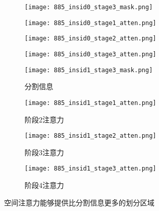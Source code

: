 \begin{figure*}
	\centering
	\begin{minipage}{\textwidth}
		\centering
		\begin{subfigure}{0.23\linewidth}
			\texttt{[image: 885\_insid0\_stage3\_mask.png]}
		\end{subfigure}
		\begin{subfigure}{0.23\linewidth}
			\texttt{[image: 885\_insid0\_stage1\_atten.png]}
		\end{subfigure}
		\begin{subfigure}{0.23\linewidth}
			\texttt{[image: 885\_insid0\_stage2\_atten.png]}
		\end{subfigure}
		\begin{subfigure}{0.23\linewidth}
			\texttt{[image: 885\_insid0\_stage3\_atten.png]}
		\end{subfigure}
		\begin{sideways}
			\begin{minipage}{1cm}
			\end{minipage}
		\end{sideways}
	\end{minipage}
	
	\vskip2pt
	\begin{minipage}{\textwidth}
		\centering
		\begin{subfigure}{0.23\linewidth}
			\texttt{[image: 885\_insid1\_stage3\_mask.png]}
			\caption{分割信息}
		\end{subfigure}
		\begin{subfigure}{0.23\linewidth}
			\texttt{[image: 885\_insid1\_stage1\_atten.png]}
			\caption{阶段2注意力}
		\end{subfigure}
		\begin{subfigure}{0.23\linewidth}
			\texttt{[image: 885\_insid1\_stage2\_atten.png]}
			\caption{阶段3注意力}
		\end{subfigure}
		\begin{subfigure}{0.23\linewidth}
			\texttt{[image: 885\_insid1\_stage3\_atten.png]}
			\caption{阶段4注意力}
		\end{subfigure}
		\begin{sideways}
			\begin{minipage}{1cm}
				\rightline{被遮挡人}
			\end{minipage}
		\end{sideways}
	\end{minipage}
	\caption{空间注意力能够提供比分割信息更多的划分区域}
	\label{fig:attention_mask}
\end{figure*}

